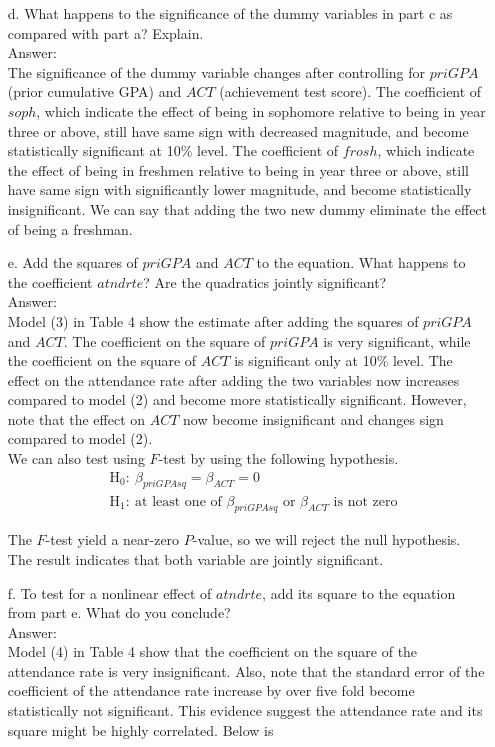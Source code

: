 \documentclass[10pt]{article}
\begin{document}
\begin{enumerate}
\item[d.] What happens to the significance of the dummy variables in part c as compared with part a? Explain.
\\ Answer:\\
The significance of the dummy variable changes after controlling for $priGPA$ (prior cumulative GPA) and $ACT$ (achievement test score). The coefficient of $soph$, which indicate the effect of being in sophomore relative to being in year three or above, still have same sign with decreased magnitude, and become statistically significant at 10\% level. The coefficient of $frosh$, which indicate the effect of being in freshmen relative to being in year three or above, still have same sign with significantly lower magnitude, and become statistically insignificant. We can say that adding the two new dummy eliminate the effect of being a freshman.

\item[e.] Add the squares of $priGPA$ and $ACT$ to the equation. What happens to the coefficient $atndrte$? Are the quadratics jointly significant?
\\ Answer:\\
Model (3) in Table 4 show the estimate after adding the squares of $priGPA$ and $ACT$. The coefficient on the square of $priGPA$ is very significant, while the coefficient on the square of $ACT$ is significant only at 10\% level. The effect on the attendance rate after adding the two variables now increases compared to model (2) and become more statistically significant. However, note that the effect on $ACT$ now become insignificant and changes sign compared to model (2).\\
We can also test using $F$-test by using the following hypothesis.
\begin{align*}
    &\text{H}_0:\ \beta_{priGPAsq}=\beta_{ACT}=0\\
    &\text{H}_1:\ \text{at least one of }\beta_{priGPAsq}\text{ or }\beta_{ACT} \text{ is not zero}
\end{align*}

The $F$-test yield a near-zero $P$-value, so we will reject the null hypothesis. The result indicates that both variable are jointly significant.

\item[f.] To test for a nonlinear effect of $atndrte$, add its square to the equation from part e. What do you conclude? 
\\ Answer:\\
Model (4) in Table 4 show that the coefficient on the square of the attendance rate is very insignificant. Also, note that the standard error of the coefficient of the attendance rate increase by over five fold become statistically not significant. This evidence suggest the attendance rate and its square might be highly correlated. Below is
\end{enumerate}
\end{document}

